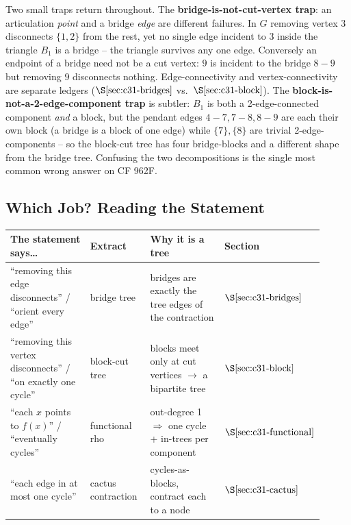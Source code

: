 Two small traps return throughout.  The \textbf{bridge-is-not-cut-vertex trap}:
an articulation \emph{point} and a bridge \emph{edge} are different failures.  In
\(G\) removing vertex \(3\) disconnects \(\{1,2\}\) from the rest, yet no single
edge incident to \(3\) inside the triangle \(B_1\) is a bridge -- the triangle
survives any one edge.  Conversely an endpoint of a bridge need not be a cut
vertex: \(9\) is incident to the bridge \(8\!-\!9\) but removing \(9\) disconnects
nothing.  Edge-connectivity and vertex-connectivity are separate ledgers
(\(\secref{c31-bridges}\) vs.\ \(\secref{c31-block}\)).  The
\textbf{block-is-not-a-2-edge-component trap} is subtler: \(B_1\) is both a
2-edge-connected component \emph{and} a block, but the pendant edges
\(4\!-\!7,7\!-\!8,8\!-\!9\) are each their own block (a bridge is a block of one
edge) while \(\{7\},\{8\}\) are trivial 2-edge-components -- so the block-cut tree
has four bridge-blocks and a different shape from the bridge tree.  Confusing the
two decompositions is the single most common wrong answer on CF 962F.

\subsection*{Which Job? Reading the Statement}

\begin{center}
\renewcommand{\arraystretch}{1.25}
\setlength{\tabcolsep}{3pt}
\begin{tabular}{@{}p{0.30\linewidth} p{0.20\linewidth} p{0.28\linewidth} >{\raggedright\arraybackslash}p{0.13\linewidth}@{}}
\toprule
\textbf{The statement says\dots} & \textbf{Extract} & \textbf{Why it is a tree} & \textbf{Section}\\
\midrule
``removing this edge disconnects'' / ``orient every edge'' & bridge tree & bridges are exactly the tree edges of the contraction & \(\secref{c31-bridges}\)\\
``removing this vertex disconnects'' / ``on exactly one cycle'' & block-cut tree & blocks meet only at cut vertices \(\to\) a bipartite tree & \(\secref{c31-block}\)\\
``each \(x\) points to \(f(x)\)'' / ``eventually cycles'' & functional rho & out-degree 1 \(\Rightarrow\) one cycle + in-trees per component & \(\secref{c31-functional}\)\\
``each edge in at most one cycle'' & cactus contraction & cycles-as-blocks, contract each to a node & \(\secref{c31-cactus}\)\\
\bottomrule
\end{tabular}
\end{center}

